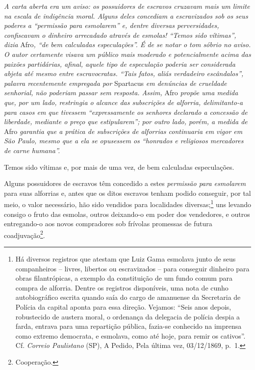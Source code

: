 {\begin{didascalia}
\emph{A carta aberta era um aviso: os possuidores de escravos cruzavam
mais um limite na escala de indigência moral. Alguns deles concediam a
escravizados sob os seus poderes a ``permissão para esmolarem'' e, dentre
diversas perversidades, confiscavam o dinheiro arrecadado através de
esmolas! ``Temos sido vítimas'', dizia} Afro\emph{, ``de bem calculadas
especulações''. É de se notar o tom sóbrio no aviso. O autor certamente
visava um público mais moderado e potencialmente acima das paixões
partidárias, afinal, aquele tipo de especulação poderia ser considerada
abjeta até mesmo entre escravocratas. ``Tais fatos, aliás verdadeiro
escândalos'', palavra recentemente empregada por} Spartacus \emph{em
denúncias de crueldade senhorial, não poderiam passar sem resposta.
Assim,} Afro \emph{propõe uma medida que, por um lado, restringia o
alcance das subscrições de alforria, delimitanto-a para casos em que
tivessem ``expressamente os senhores declarado a concessão de liberdade,
mediante o preço que estipularem''; por outro lado, porém, a medida de}
Afro \emph{garantia que a prática de subscrições de alforrias
continuaria em vigor em São Paulo, mesmo que a ela se opusessem os
``honrados e religiosos mercadores de carne humana''.}
\end{didascalia}

\asterisc{}

Temos sido vítimas e, por mais de uma vez, de bem calculadas
especulações.

Alguns possuidores de escravos têm concedido a estes \emph{permissão
para esmolarem} para suas alforrias e, antes que os ditos escravos
tenham podido conseguir, por tal meio, o valor necessário, hão sido
vendidos para localidades diversas;\footnote{ Há diversos registros que
  atestam que Luiz Gama esmolava junto de seus companheiros -- livres,
  libertos ou escravizados -- para conseguir dinheiro para obras
  filantrópicas, a exemplo da constituição de um fundo comum para compra
  de alforria. Dentre os registros disponíveis, uma nota de cunho
  autobiográfico escrita quando saía do cargo de amanuense da Secretaria
  de Polícia da capital aponta para essa direção. Vejamos: ``Seis anos
  depois, robustecido de austera moral, o ordenança da delegacia de
  polícia despia a farda, entrava para uma repartição pública, fazia-se
  conhecido na imprensa como extremo democrata, e esmolava, como até
  hoje, para remir os cativos''. Cf. \emph{Correio Paulistano} (SP), A
  Pedido, Pela última vez, 03/12/1869, p.~1.} uns levando consigo o
fruto das esmolas, outros deixando-o em poder dos vendedores, e outros
entregando-o aos novos compradores sob frívolas promessas de futura
coadjuvação\footnote{ Cooperação.}.

}

